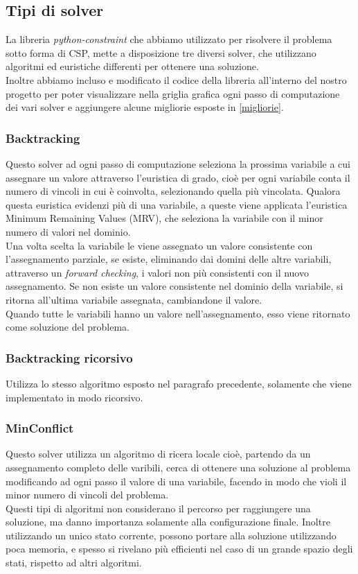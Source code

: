 \subsection{Tipi di solver}
La libreria \textit{python-constraint} che abbiamo utilizzato per risolvere il problema sotto forma di CSP, mette a disposizione tre diversi solver, che utilizzano algoritmi ed euristiche differenti per ottenere una soluzione. \\
Inoltre abbiamo incluso e modificato il codice della libreria all'interno del nostro progetto per poter visualizzare nella griglia grafica ogni passo di computazione dei vari solver e aggiungere alcune migliorie esposte in \ref{migliorie}.
\subsubsection{Backtracking}
Questo solver ad ogni passo di computazione seleziona la prossima variabile a cui assegnare un valore attraverso l'euristica di grado, cioè per ogni variabile conta il numero di vincoli in cui è coinvolta, selezionando quella più vincolata. Qualora questa euristica evidenzi più di una variabile, a queste viene applicata l'euristica Minimum Remaining Values (MRV), che seleziona la variabile con il minor numero di valori nel dominio.\\
Una volta scelta la variabile le viene assegnato un valore consistente con l'assegnamento parziale, se esiste, eliminando dai domini delle altre variabili, attraverso un \textit{forward checking}, i valori non più consistenti con il nuovo assegnamento. Se non esiste un valore consistente nel dominio della variabile, si ritorna all'ultima variabile assegnata, cambiandone il valore. \\
Quando tutte le variabili hanno un valore nell'assegnamento, esso viene ritornato come soluzione del problema.
\subsubsection{Backtracking ricorsivo}
Utilizza lo stesso algoritmo esposto nel paragrafo precedente, solamente che viene implementato in modo ricorsivo.
\subsubsection{MinConflict}
Questo solver utilizza un algoritmo di ricera locale cioè, partendo da un assegnamento completo delle varibili, cerca di ottenere una soluzione al problema modificando ad ogni passo il valore di una variabile, facendo in modo che violi il minor numero di vincoli del problema. \\
Questi tipi di algoritmi non considerano il percorso per raggiungere una soluzione, ma danno importanza solamente alla configurazione finale. Inoltre utilizzando un unico stato corrente, possono portare alla soluzione utilizzando poca memoria, e spesso si rivelano più efficienti nel caso di un grande spazio degli stati, rispetto ad altri algoritmi.\\

